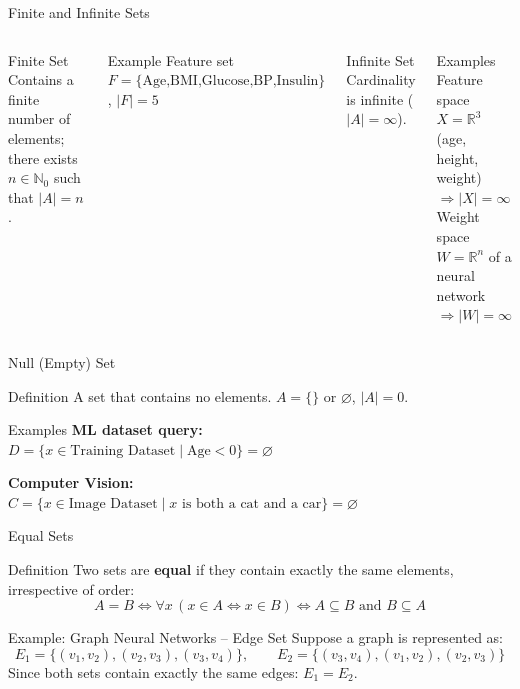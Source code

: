 \documentclass[aspectratio=169]{beamer}
\begin{document}
\begin{frame}{Finite and Infinite Sets}
\begin{columns}
\begin{block}{Finite Set}
Contains a finite number of elements; there exists $n\in\mathbb{N}_0$ such that $|A|=n$.
\end{block}
\begin{exampleblock}{Example}
Feature set $F=\{\text{Age,BMI,Glucose,BP,Insulin}\}$, $|F|=5$
\end{exampleblock}

\begin{block}{Infinite Set}
Cardinality is infinite ($|A|=\infty$).
\end{block}
\begin{exampleblock}{Examples}
Feature space $X=\mathbb{R}^3$ (age, height, weight) $\Rightarrow |X|=\infty$ \\
Weight space $W=\mathbb{R}^n$ of a neural network $\Rightarrow |W|=\infty$
\end{exampleblock}
\end{columns}
\end{frame}

\begin{frame}{Null (Empty) Set}
\begin{block}{Definition}
A set that contains no elements. $A=\{\}$ or $\varnothing$, $|A|=0$.
\end{block}
\begin{exampleblock}{Examples}
\textbf{ML dataset query:} \\
$D=\{x\in \text{Training Dataset} \mid \text{Age}<0\} = \varnothing$

\medskip
\textbf{Computer Vision:} \\
$C=\{x\in \text{Image Dataset} \mid x \text{ is both a cat and a car}\} = \varnothing$
\end{exampleblock}
\end{frame}

\begin{frame}{Equal Sets}
\begin{block}{Definition}
Two sets are \textbf{equal} if they contain exactly the same elements, irrespective of order:
$$A=B \iff \forall x\,(x\in A \iff x\in B) \iff A\subseteq B \text{ and } B\subseteq A$$
\end{block}
\begin{exampleblock}{Example: Graph Neural Networks -- Edge Set}
Suppose a graph is represented as:
$$E_1=\{(v_1,v_2),(v_2,v_3),(v_3,v_4)\}, \qquad E_2=\{(v_3,v_4),(v_1,v_2),(v_2,v_3)\}$$
Since both sets contain exactly the same edges: $E_1=E_2$.
\end{exampleblock}
\end{frame}
\end{document}
